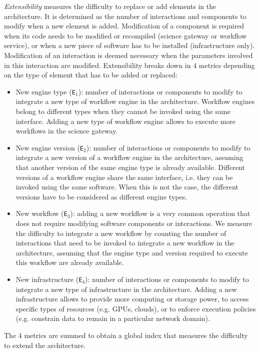 \documentclass[preprint,3p,twocolumn]{elsarticle}
\newcommand{\todo}[1]{\color{blue}\xspace[\emph{#1}]\xspace\color{black}}
\begin{document}
\emph{Extensibility} measures the difficulty to replace or add
elements in the architecture. It is determined as the number of
interactions and components to modify when a new element is
added. Modification of a component is required when its code needs to
be modified or recompiled (science gateway or workflow service), or
when a new piece of software has to be installed (infrastructure
only). Modification of an interaction is deemed necessary when the
parameters involved in this interaction are modified.  Extensibility
breaks down in 4 metrics depending on the type of element that has to
be added or replaced:
\begin{itemize}[leftmargin=0cm,itemindent=0.35cm,itemsep=0cm]
\item New engine type (\texttt{E$_1$}): number of interactions or
  components to modify to integrate a new type of workflow engine in
  the architecture. Workflow engines belong to different types when
  they cannot be invoked using the same interface. Adding a new type
  of workflow engine allows to execute more workflows in the science
  gateway.
\item New engine version (\texttt{E$_2$}): number of interactions or
  components to modify to integrate a new version of a workflow engine
  in the architecture, assuming that another version of the same
  engine type is already available. Different versions of a workflow
  engine share the same interface, i.e. they can be invoked using the
  same software. When this is not the case, the different versions
  have to be considered as different engine types. 
\item New workflow (\texttt{E$_3$}): adding a new workflow is a very
  common operation that does not require modifying software components
  or interactions. We measure the difficulty to integrate a new
  workflow by counting the number of interactions that need to be
  invoked to integrate a new workflow in the architecture, assuming
  that the engine type and version required to execute this workflow
  are already available.
\item New infrastructure (\texttt{E$_4$}): number of interactions or components to
  modify to integrate a new type of infrastructure in the
  architecture. Adding a new infrastructure allows to provide more
  computing or storage power, to access specific types of resources
  (e.g. GPUs, clouds), or to enforce execution policies 
  (e.g. constrain data to remain in a particular network domain).
\end{itemize}
The 4 metrics are summed to obtain a global index that measures the
difficulty to extend the architecture.
\end{document}
